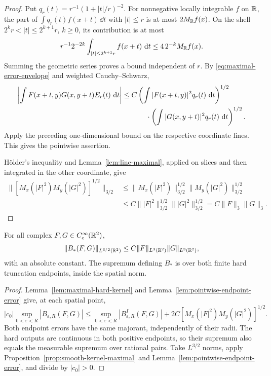 \begin{proof}
Put $q_r(t)=r^{-1}(1+|t|/r)^{-2}$. For nonnegative locally integrable
$f$ on $\mathbb R$, the part of $\int q_r(t)f(x+t)\,\dd t$ with $|t|\le r$
is at most $2M_{\mathbb R}f(x)$. On the shell
$2^kr<|t|\le2^{k+1}r$, $k\ge0$, its contribution is at most
\[
 r^{-1}2^{-2k}\int_{|t|\le2^{k+1}r}f(x+t)\,\mathop{}\!\mathrm d t
 \le 4\,2^{-k}M_{\mathbb R}f(x).
\]
Summing the geometric series proves a bound independent of $r$.
By \eqref{eq:maximal-error-envelope} and weighted Cauchy--Schwarz,
\begin{align*}
 \left|\int F(x+t,y)G(x,y+t)E_r(t)\,\dd t\right|
 &\le C\left(\int |F(x+t,y)|^2q_r(t)\,\dd t\right)^{1/2}\\
 &\hspace{12mm}\cdot
       \left(\int |G(x,y+t)|^2q_r(t)\,\dd t\right)^{1/2}.
\end{align*}
Apply the preceding one-dimensional bound on the respective coordinate
lines. This gives the pointwise assertion.

H\"older's inequality and Lemma~\ref{lem:line-maximal}, applied on slices
and then integrated in the other coordinate, give
\begin{align*}
 \|[M_x(|F|^2)M_y(|G|^2)]^{1/2}\|_{3/2}
 &\le\|M_x(|F|^2)\|_{3/2}^{1/2}
       \|M_y(|G|^2)\|_{3/2}^{1/2}\\
 &\le C\||F|^2\|_{3/2}^{1/2}\||G|^2\|_{3/2}^{1/2}
  =C\|F\|_3\|G\|_3.
\end{align*}
\end{proof}

\begin{proposition}\label{prop:compact-maximal}
For all complex $F,G\in C_c^\infty(\mathbb R^2)$,
\[
 \|B_*(F,G)\|_{L^{3/2}(\mathbb R^2)}
 \le C\|F\|_{L^3(\mathbb R^2)}\|G\|_{L^3(\mathbb R^2)},
\]
with an absolute constant. The supremum defining $B_*$ is over both
finite hard truncation endpoints, inside the spatial norm.
\end{proposition}

\begin{proof}
Lemma~\ref{lem:maximal-hard-kernel} and
Lemma~\ref{lem:pointwise-endpoint-error} give, at each spatial point,
\[
 |c_0|\sup_{0<\varepsilon<R}|B_{\varepsilon,R}(F,G)|
 \le \sup_{0<\varepsilon<R}|B^I_{\varepsilon,R}(F,G)|
       +2C[M_x(|F|^2)M_y(|G|^2)]^{1/2}.
\]
Both endpoint errors have the same majorant, independently of their
radii. The hard outputs are continuous in both positive endpoints,
so their supremum also equals the measurable supremum over rational
pairs. Take $L^{3/2}$ norms, apply
Proposition~\ref{prop:smooth-kernel-maximal} and
Lemma~\ref{lem:pointwise-endpoint-error}, and divide by $|c_0|>0$.
\end{proof}
